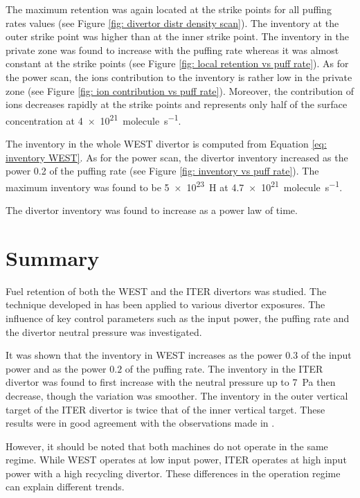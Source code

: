 The maximum retention was again located at the strike points for all puffing rates values (see Figure \ref{fig: divertor distr density scan}).
The inventory at the outer strike point was higher than at the inner strike point.
The inventory in the private zone was found to increase with the puffing rate whereas it was almost constant at the strike points (see Figure \ref{fig: local retention vs puff rate}).
As for the power scan, the ions contribution to the inventory is rather low in the private zone (see Figure \ref{fig: ion contribution vs puff rate}).
Moreover, the contribution of ions decreases rapidly at the strike points and represents only half of the surface concentration at \SI{4e21}{molecule.s^{-1}}.

The inventory in the whole WEST divertor is computed from Equation \eqref{eq: inventory WEST}.
As for the power scan, the divertor inventory increased as the power 0.2 of the puffing rate (see Figure \ref{fig: inventory vs puff rate}).
The maximum inventory was found to be \SI{5e23}{H} at \SI{4.7e21}{molecule.s^{-1}}.

The divertor inventory was found to increase as a power law of time.

\section{Summary}

Fuel retention of both the WEST and the ITER divertors was studied.
The technique developed in \cite{delaporte-mathurin_parametric_2020} has been applied to various divertor exposures.
The influence of key control parameters such as the input power, the puffing rate and the divertor neutral pressure was investigated.

It was shown that the inventory in WEST increases as the power $0.3$ of the input power and as the power $0.2$ of the puffing rate.
The inventory in the ITER divertor was found to first increase with the neutral pressure up to \SI{7}{Pa} then decrease, though the variation was smoother.
The inventory in the outer vertical target of the ITER divertor is twice that of the inner vertical target.
These results were in good agreement with the observations made in \cite{pitts_physics_2019}.

However, it should be noted that both machines do not operate in the same regime.
While WEST operates at low input power, ITER operates at high input power with a high recycling divertor.
These differences in the operation regime can explain different trends.

